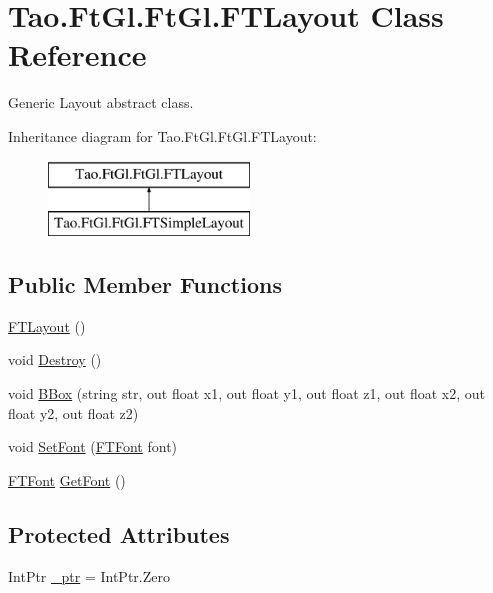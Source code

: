 \hypertarget{class_tao_1_1_ft_gl_1_1_ft_gl_1_1_f_t_layout}{
\section{Tao.FtGl.FtGl.FTLayout Class Reference}
\label{class_tao_1_1_ft_gl_1_1_ft_gl_1_1_f_t_layout}
}


Generic Layout abstract class.  


Inheritance diagram for Tao.FtGl.FtGl.FTLayout:\begin{figure}[H]
\begin{center}
\leavevmode
\includegraphics[height=2.000000cm]{class_tao_1_1_ft_gl_1_1_ft_gl_1_1_f_t_layout}
\end{center}
\end{figure}
\subsection*{Public Member Functions}
\begin{DoxyCompactItemize}
\item 
\hyperlink{class_tao_1_1_ft_gl_1_1_ft_gl_1_1_f_t_layout_a30ade086b2d1393537835f2cdd728d62}{FTLayout} ()
\item 
void \hyperlink{class_tao_1_1_ft_gl_1_1_ft_gl_1_1_f_t_layout_a2c8911fa730faa0654c4d457f39c5977}{Destroy} ()
\item 
void \hyperlink{class_tao_1_1_ft_gl_1_1_ft_gl_1_1_f_t_layout_a116034b9fc122b30e02f40371120ffa0}{BBox} (string str, out float x1, out float y1, out float z1, out float x2, out float y2, out float z2)
\item 
void \hyperlink{class_tao_1_1_ft_gl_1_1_ft_gl_1_1_f_t_layout_abe91feb7810ee22aedadd98c10cad0fb}{SetFont} (\hyperlink{class_tao_1_1_ft_gl_1_1_ft_gl_1_1_f_t_font}{FTFont} font)
\item 
\hyperlink{class_tao_1_1_ft_gl_1_1_ft_gl_1_1_f_t_font}{FTFont} \hyperlink{class_tao_1_1_ft_gl_1_1_ft_gl_1_1_f_t_layout_a4910f991a632a7038c2138ac5a2aaa36}{GetFont} ()
\end{DoxyCompactItemize}
\subsection*{Protected Attributes}
\begin{DoxyCompactItemize}
\item 
IntPtr \hyperlink{class_tao_1_1_ft_gl_1_1_ft_gl_1_1_f_t_layout_a55470340a991aad252c8cd5d29071fe7}{\_\-ptr} = IntPtr.Zero
\end{DoxyCompactItemize}


